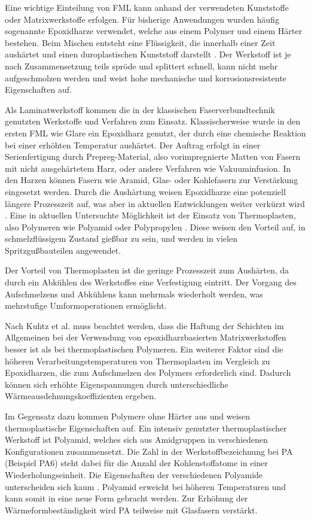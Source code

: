 
Eine wichtige Einteilung von FML kann anhand der verwendeten Kunststoffe oder Matrixwerkstoffe erfolgen. Für bisherige Anwendungen wurden häufig sogenannte Epoxidharze verwendet, welche aus einem Polymer und einem Härter bestehen. Beim Mischen entsteht eine Flüssigkeit, die innerhalb einer Zeit aushärtet und einen duroplastischen Kunststoff darstellt \cite{Dornbusch.2015}. Der Werkstoff ist je nach Zusammensetzung teils spröde und splittert schnell, kann nicht mehr aufgeschmolzen werden und weist hohe mechanische und korrosionsresistente Eigenschaften auf.

Als Laminatwerkstoff kommen die in der klassischen Faserverbundtechnik genutzten Werkstoffe und Verfahren zum Einsatz. Klassischerweise wurde in den ersten FML wie Glare ein Epoxidharz genutzt, der durch eine chemische Reaktion bei einer erhöhten Temperatur aushärtet. Der Auftrag erfolgt in einer Serienfertigung durch Prepreg-Material, also vorimpregnierte Matten von Fasern mit nicht ausgehärtetem Harz, oder andere Verfahren wie Vakuuminfusion. In den Harzen können Fasern wie Aramid, Glas- oder Kohlefasern zur Verstärkung eingesetzt werden. Durch die Aushärtung weisen Epoxidharze eine potenziell längere Prozesszeit auf, was aber in aktuellen Entwicklungen weiter verkürzt wird \cite{Lakho.2017}. 
Eine in aktuellen Untersuchte Möglichkeit ist der Einsatz von Thermoplasten, also Polymeren wie Polyamid oder Polypropylen \cite{Flock.2012}. Diese weisen den Vorteil auf, in schmelzflüssigem Zustand gießbar zu sein, und werden in vielen Spritzgußbauteilen angewendet. \cite{ehrenstein.2003}

Der Vorteil von Thermoplasten ist die geringe Prozesszeit zum Aushärten, da durch ein Abkühlen des Werkstoffes eine Verfestigung eintritt. Der Vorgang des Aufschmelzens und Abkühlens kann mehrmals wiederholt werden, was mehrstufige Umformoperationen ermöglicht. 

Nach Kuhtz et al. \cite{Kuhtz.2019} muss beachtet werden, dass die Haftung der Schichten im Allgemeinen bei der Verwendung von epoxidharzbasierten Matrixwerkstoffen besser ist als bei thermoplastischen Polymeren. Ein weiterer Faktor sind die höheren Verarbeitungstemperaturen von Thermoplasten im Vergleich zu Epoxidharzen, die zum Aufschmelzen des Polymers erforderlich sind. Dadurch können sich erhöhte Eigenspannungen durch unterschiedliche Wärmeausdehnungskoeffizienten ergeben. 

Im Gegensatz dazu kommen Polymere ohne Härter aus und weisen thermoplastische Eigenschaften auf. Ein intensiv genutzter thermoplastischer Werkstoff ist Polyamid, welches sich aus Amidgruppen in verschiedenen Konfigurationen zusammensetzt. Die Zahl in der Werkstoffbezeichnung bei PA (Beispiel PA6) steht dabei für die Anzahl der Kohlenstoffatome in einer Wiederholungseinheit. Die Eigenschaften der verschiedenen Polyamide unterscheiden sich kaum \cite{Flock.2012}.
Polyamid erweicht bei höheren Temperaturen und kann somit in eine neue Form gebracht werden. Zur Erhöhung der Wärmeformbeständigkeit wird PA teilweise mit Glasfasern verstärkt. \cite{Baur.2007}


